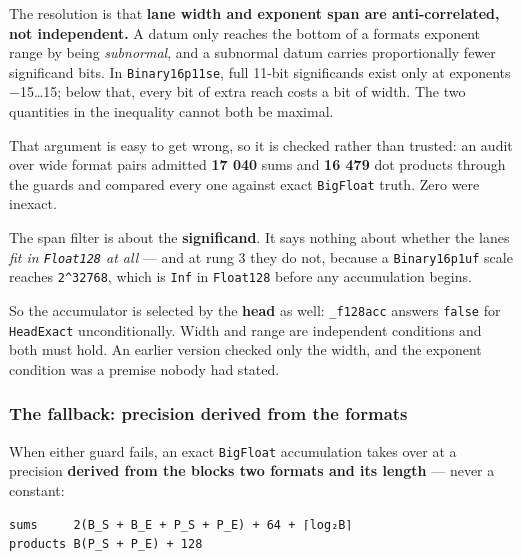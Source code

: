 The resolution is that \textbf{lane width and exponent span are anti-correlated, not independent.} A datum only reaches the bottom of a format{\textquotesingle}s exponent range by being \emph{subnormal}, and a subnormal datum carries proportionally fewer significand bits. In \texttt{Binary16p11se}, full 11-bit significands exist only at exponents −15…15; below that, every bit of extra reach costs a bit of width. The two quantities in the inequality cannot both be maximal.



That argument is easy to get wrong, so it is checked rather than trusted: an audit over wide format pairs admitted \textbf{17 040} sums and \textbf{16 479} dot products through the guards and compared every one against exact \texttt{BigFloat} truth. Zero were inexact.



\begin{tcolorbox}[toptitle=-1mm,bottomtitle=1mm,colback=admonition-note!50!white,colframe=admonition-note,title=\textbf{Two guards, not one}]
The span filter is about the \textbf{significand}. It says nothing about whether the lanes \emph{fit in \texttt{Float128} at all} — and at rung 3 they do not, because a \texttt{Binary16p1uf} scale reaches \texttt{2{\textasciicircum}32768}, which is \texttt{Inf} in \texttt{Float128} before any accumulation begins.

So the accumulator is selected by the \textbf{head} as well: \texttt{\_\allowbreak{}f128acc} answers \texttt{false} for \texttt{HeadExact} unconditionally. Width and range are independent conditions and both must hold. An earlier version checked only the width, and the exponent condition was a premise nobody had stated.

\end{tcolorbox}


\subsubsection{The fallback: precision derived from the formats}



\label{15282486921870925590}{}


When either guard fails, an exact \texttt{BigFloat} accumulation takes over at a precision \textbf{derived from the block{\textquotesingle}s two formats and its length} — never a constant:




\nopagebreak[4]
\begin{verbatim}
sums     2(B_S + B_E + P_S + P_E) + 64 + ⌈log₂B⌉
products B(P_S + P_E) + 128
\end{verbatim}




